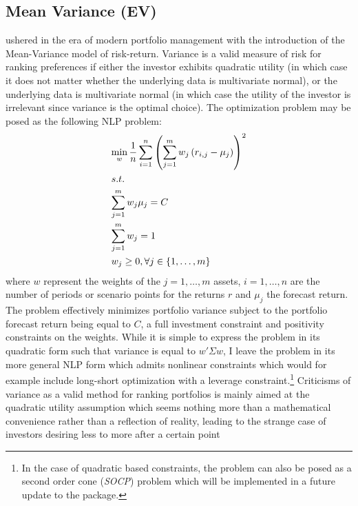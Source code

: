 \subsection{Mean Variance (EV)}
 ushered in the era of modern portfolio management
with the introduction of the Mean-Variance model of risk-return. Variance is
a valid measure of risk for ranking preferences if either the investor
exhibits quadratic utility (in which case it does not matter whether the
underlying data is multivariate normal), or the underlying data is
multivariate normal (in which case the utility of the investor is irrelevant
since variance is the optimal choice). The optimization problem may be posed
as the following NLP problem:
\begin{equation}\label{mvnlp}
\begin{gathered}
  \mathop {\min }\limits_w \frac{1}{n}\sum\limits_{i=1}^n {{{\left( {\sum\limits_{j=1}^m {{w_j}\left( {{r_{i,j}} - {\mu _j}} \right)} } \right)}^2}}  \hfill \\
  s.t. \hfill \\
  \sum\limits_{j=1}^m {{w_j}{\mu _j}=C}  \hfill \\
  \sum\limits_{j=1}^m {{w_j}=1}  \hfill \\
  {w_j} \ge 0,\forall j \in \left\{ {1,\dots,m} \right\} \hfill \\
\end{gathered}
\end{equation}
where $w$ represent the weights of the $j=1,\dots,m$ assets, $i=1,\dots,n$
are the number of periods or scenario points for the returns $r$ and $\mu_j$
the forecast return. The problem effectively minimizes portfolio variance
subject to the portfolio forecast return being equal to $C$, a full
investment constraint and positivity constraints on the weights. While it is
simple to express the problem in its quadratic form such that variance is
equal to $w'\Sigma w$, I leave the problem in its more general NLP form which
admits nonlinear constraints which would for example include long-short
optimization with a leverage constraint.\footnote{In the case of quadratic
based constraints, the problem can also be posed as a second order cone
(\emph{SOCP}) problem which will be implemented in a future update to the
package.} Criticisms of variance as a valid method for ranking portfolios is
mainly aimed at the quadratic utility assumption which seems nothing more
than a mathematical convenience rather than a reflection of reality, leading
to the strange case of investors desiring less to more after a certain point
